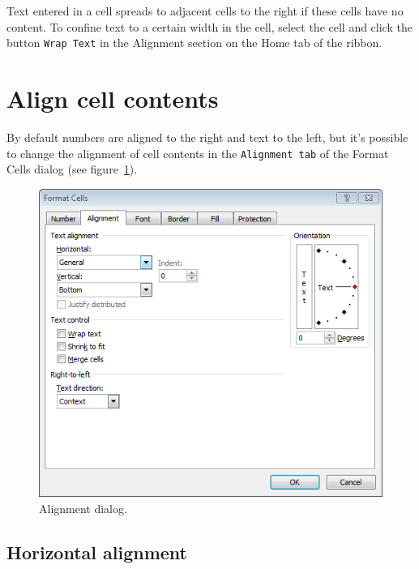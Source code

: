 Text entered in a cell spreads to adjacent cells to the right if these cells have no content. To confine text to a certain width in the cell, select the cell and click the button \texttt{Wrap Text} in the Alignment section on the Home tab of the ribbon.

\section{Align cell contents}\hypertarget{align-cell-contents}{}\label{align-cell-contents}

By default numbers are aligned to the right and text to the left, but it's possible to change the alignment of cell
contents in the \texttt{Alignment tab} of the Format Cells dialog (see figure~\ref{img-alignment_dialog}).

\begin{figure}[htbp]
\begin{center}
\includegraphics[scale=0.7]{../img/alignment_dialog.png}
\end{center}
\caption{Alignment dialog.}
\label{img-alignment_dialog}
\end{figure}

\subsection{Horizontal alignment}\hypertarget{horizontal-alignment}{}\label{horizontal-alignment}

